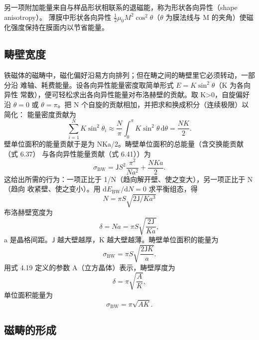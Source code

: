 另一项附加能量来自与样品形状相联系的退磁能，称为形状各向异性（shape anisotropy）。
薄膜中形状各向异性 $\frac{1}{2}\mu_0M^{2}\cos^{2}\theta$（$\theta$ 为膜法线与 M
的夹角）使磁化强度保持在膜面内以节省能量。

\subsection{畴壁宽度}

铁磁体的磁畴中，磁化偏好沿易方向排列；但在畴之间的畴壁里它必须转动，一部分沿
难轴、耗费能量。设各向异性能量密度取简单形式 $E=K\sin^{2}\theta$（K 为各向异性
常数），便可轻松求出各向异性能量对布洛赫壁的贡献。取 K>0，自旋偏好沿 $\theta=0$
或 $\theta=\pi$。把 N 个自旋的贡献相加，并把求和换成积分（连续极限）以简化：
能量密度贡献为
\begin{equation*}
\sum_{i=1}^{N}K\sin^{2}\theta_i \approx \frac{N}{\pi}\int_{0}^{\pi}K\sin^{2}\theta\,\mathrm{d}\theta = \frac{NK}{2}.\tag{6.41}
\end{equation*}
壁单位面积的能量贡献于是为 NKa/2。畴壁单位面积的总能量（含交换能贡献（式 6.37）
与各向异性能量贡献（式 6.41））为
\begin{equation*}
\sigma_{\mathrm{BW}} = \mathsf{J}S^{2}\frac{\pi^{2}}{Na^{2}} + \frac{NKa}{2}.\tag{6.42}
\end{equation*}
这给出所需的行为：一项正比于 1/N（趋向解开壁、使之变大），另一项正比于 N（趋向
收紧壁、使之变小）。用 $\mathrm{d}E_{\mathrm{BW}}/\mathrm{d}N=0$ 求平衡组态，得
\begin{equation*}
N = \pi S\sqrt{2\mathsf{J}/Ka^{3}}\tag{6.43}
\end{equation*}
布洛赫壁宽度为
\begin{equation*}
\delta = Na = \pi S\sqrt{\frac{2\mathsf{J}}{Ka}},\tag{6.44}
\end{equation*}
a 是晶格间距。$\mathsf{J}$ 越大壁越厚，K 越大壁越薄。畴壁单位面积的能量为
\begin{equation*}
\sigma_{\mathrm{BW}} = \pi S\sqrt{\frac{2\mathsf{J}K}{a}}.\tag{6.45}
\end{equation*}
用式 4.19 定义的参数 A（立方晶体）表示，畴壁厚度为
\begin{equation*}
\delta = \pi\sqrt{\frac{A}{K}},\tag{6.46}
\end{equation*}
单位面积能量为
\begin{equation*}
\sigma_{\mathrm{BW}} = \pi\sqrt{AK}.\tag{6.47}
\end{equation*}

\subsection{磁畴的形成}

